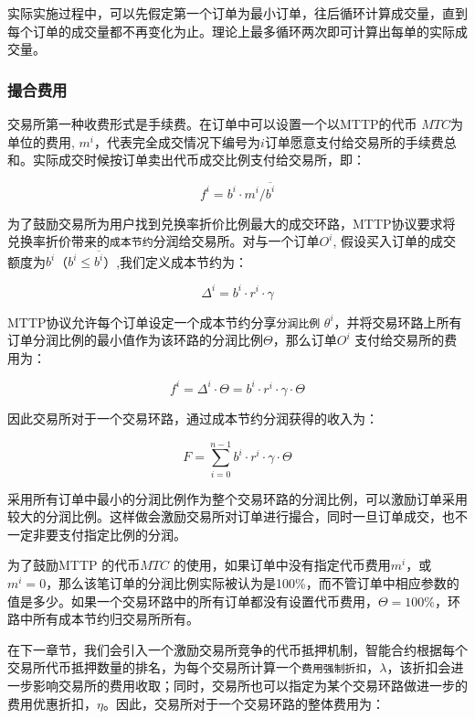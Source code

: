 \documentclass[UTF8,nofonts]{ctexart}
\begin{document}
实际实施过程中，可以先假定第一个订单为最小订单，往后循环计算成交量，直到每个订单的成交量都不再变化为止。理论上最多循环两次即可计算出每单的实际成交量。

\subsubsection{撮合费用\label{sec:fee}}

交易所第一种收费形式是手续费。在订单中可以设置一个以MTTP的代币 $MTC$为单位的费用, $m^i$，代表完全成交情况下编号为$i$订单愿意支付给交易所的手续费总和。实际成交时候按订单卖出代币成交比例支付给交易所，即：

\begin{equation*}
f^i = b^i \cdot m^i  / \overline{b^i}
\end{equation*}


为了鼓励交易所为用户找到兑换率折价比例最大的成交环路，MTTP协议要求将兑换率折价带来的\texttt{成本节约}分润给交易所。对与一个订单$O^i$, 假设买入订单的成交额度为$b^i$（$b^i \le \overline{b^i}$）,我们定义成本节约为：

\begin{equation*}
\Delta^i = b^i \cdot r^i \cdot \gamma
\end{equation*}

MTTP协议允许每个订单设定一个成本节约分享\texttt{分润比例} $\theta^i$，并将交易环路上所有订单分润比例的最小值作为该环路的分润比例$\Theta$，那么订单$O^i$ 支付给交易所的费用为：


\begin{equation*}
f^i = \Delta^i \cdot \Theta = b^i \cdot r^i \cdot \gamma \cdot \Theta
\end{equation*}

因此交易所对于一个交易环路，通过成本节约分润获得的收入为：

\begin{equation*}
F = \sum^{n-1}_{i=0} b^i \cdot r^i \cdot \gamma \cdot \Theta
\end{equation*}

采用所有订单中最小的分润比例作为整个交易环路的分润比例，可以激励订单采用较大的分润比例。这样做会激励交易所对订单进行撮合，同时一旦订单成交，也不一定非要支付指定比例的分润。


为了鼓励MTTP 的代币$MTC$ 的使用，如果订单中没有指定代币费用$m^i$，或$m^i=0$，那么该笔订单的分润比例实际被认为是100\%，而不管订单中相应参数的值是多少。如果一个交易环路中的所有订单都没有设置代币费用，$\Theta=100\%$，环路中所有成本节约归交易所所有。


在下一章节，我们会引入一个激励交易所竞争的代币抵押机制，智能合约根据每个交易所代币抵押数量的排名，为每个交易所计算一个\texttt{费用强制折扣}，$\lambda$，该折扣会进一步影响交易所的费用收取；同时，交易所也可以指定为某个交易环路做进一步的费用优惠折扣，$\eta$。因此，交易所对于一个交易环路的整体费用为：
\end{document}
